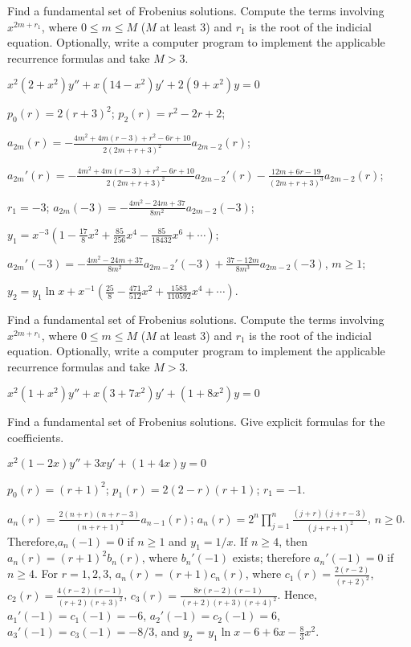 \documentclass{ximera}
\begin{document}
\begin{problem}\label{exer:7.6.42}
Find a
fundamental set of Frobenius solutions. Compute the terms involving
$x^{2m+r_1}$, where $0\le m\le M$ ($M$ at least $3$) and $r_1$ is the
root of the indicial equation. Optionally, write a computer program to
implement the applicable recurrence formulas and take $M>3$.

$x^2(2+x^2)y''+x(14-x^2)y'+2(9+x^2)y=0$

\begin{solution}
    $p_0(r)=2(r+3)^2$;
$p_2(r)=r^2-2r+2$;

$a_{2m}(r)=
-\frac{4m^2+4m(r-3)+r^2-6r+10}{2(2m+r+3)^2}a_{2m-2}(r)$;


$a_{2m}'(r)=
-\frac{4m^2+4m(r-3)+r^2-6r+10}{2(2m+r+3)^2}a_{2m-2}'(r)
-\frac{12m+6r-19}{(2m+r+3)^3}a_{2m-2}(r)$;

$r_1=-3$;
$a_{2m}(-3)=-\frac{4m^2-24m+37}{8m^2}a_{2m-2}(-3)$;

$y_1=x^{-3}\left(1-\frac{17}{8}x^2+\frac{85}{256}x^4-
\frac{85}{18432}x^6+\cdots\right)$;


$a_{2m}'(-3)=
-\frac{4m^2-24m+37}{8m^2}a_{2m-2}'(-3)+\frac{37-12m}{8m^3}a_{2m-2}(-3)$,
$m\geq 1$;

$y_2=y_1\ln x
+x^{-1}\left(\frac{25}{8}-\frac{471}{512}x^2+\frac{1583}{110592}x^4
+\cdots\right)$.
\end{solution}
\end{problem}

\begin{problem}\label{exer:7.6.43}
Find a
fundamental set of Frobenius solutions. Compute the terms involving
$x^{2m+r_1}$, where $0\le m\le M$ ($M$ at least $3$) and $r_1$ is the
root of the indicial equation. Optionally, write a computer program to
implement the applicable recurrence formulas and take $M>3$.

$x^2(1+x^2)y''+x(3+7x^2)y'+(1+8x^2)y=0$
\end{problem}

\begin{problem}\label{exer:7.6.44}
Find a
fundamental set of Frobenius solutions. Give explicit formulas for the
coefficients.

$x^2(1-2x)y''+3xy'+(1+4x)y=0$

\begin{solution}
    $p_0(r)=(r+1)^2$;
$p_1(r)=2(2-r)(r+1)$;
$r_1=-1$.

$a_n(r)=\frac{2(n+r)(n+r-3)}{(n+r+1)^2}
a_{n-1}(r)$;
 $a_n(r)=2^n\prod_{j=1}^n\frac{(j+r)(j+r-3)}{(j+r+1)^2}$,
$n\geq 0$. Therefore,$a_n(-1)=0$ if $n\geq 1$ and $y_1=1/x$.
If $n\geq 4$, then $a_n(r)=(r+1)^2b_n(r)$, where $b_n'(-1)$
exists; therefore $a_n'(-1)=0$ if $n\geq 4$. For $r=1,2,3$,
$a_n(r)=(r+1)c_n(r)$, where
$c_1(r)=\frac{2(r-2)}{(r+2)^2}$,
$c_2(r)=\frac{4(r-2)(r-1)}{(r+2)(r+3)^2}$,
$c_3(r)=\frac
{8r(r-2)(r-1)}{(r+2)(r+3)(r+4)^2}$. Hence,
$a_1'(-1)=c_1(-1)=-6$, $a_2'(-1)=c_2(-1)=6$, $a_3'(-1)=c_3(-1)=-8/3$,
and
 $y_2=y_1\ln x-6+6x-\frac{8}{3}x^2$.

\end{solution}
\end{problem}
\end{document}
